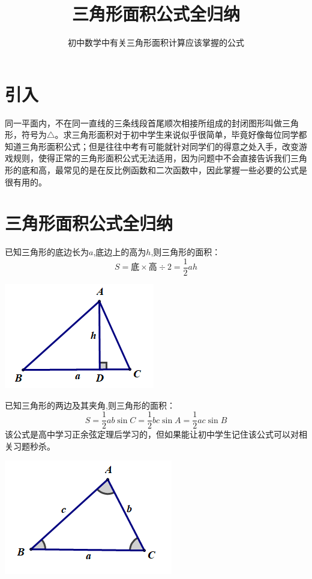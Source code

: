 \documentclass[10pt]{ctexart}
\title{\huge\heiti 三角形面积公式全归纳}
\author{初中数学中有关三角形面积计算应该掌握的公式}
\date{}
\begin{document}
\maketitle
\tableofcontents


\section{引入}
同一平面内，不在同一直线的三条线段首尾顺次相接所组成的封闭图形叫做三角形，符号为$\triangle$。求三角形面积对于初中学生来说似乎很简单，毕竟好像每位同学都知道三角形面积公式；但是往往中考有可能就针对同学们的得意之处入手，改变游戏规则，使得正常的三角形面积公式无法适用，因为问题中不会直接告诉我们三角形的底和高，最常见的是在反比例函数和二次函数中，因此掌握一些必要的公式是很有用的。
\section{三角形面积公式全归纳}

\begin{minipage}[t]{0.7\textwidth}
\begin{dkyi}{}{}
已知三角形的底边长为$a$,底边上的高为$h$,则三角形的面积：
\[S=\text{底}\times \text{高}\div 2=\dfrac{1}{2}ah\]
\end{dkyi}
\end{minipage}
\begin{minipage}[t]{0.3\textwidth}
\includegraphics[scale=0.6]{figure/mj-01.png}
\end{minipage}

\begin{minipage}[t]{0.7\textwidth}
\begin{dkyi}{}{}
已知三角形的两边及其夹角,则三角形的面积：
\[S=\dfrac{1}{2}ab \sin{C}=\dfrac{1}{2}bc \sin{A}=\dfrac{1}{2}ac \sin{B}\]
该公式是高中学习正余弦定理后学习的，但如果能让初中学生记住该公式可以对相关习题秒杀。
\end{dkyi}
\end{minipage}
\begin{minipage}[t]{0.3\textwidth}
\includegraphics[scale=0.6]{figure/mj-02.png}
\end{minipage}
\end{document}
